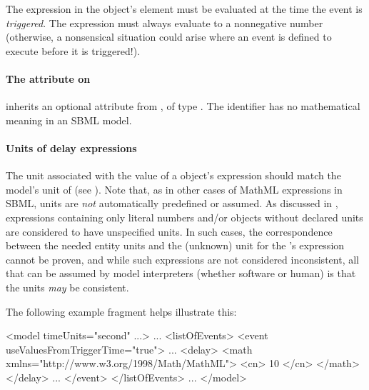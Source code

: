 The expression in the \Delay object's  element must be
evaluated at the time the event is \emph{triggered}.  The expression
must always evaluate to a nonnegative number (otherwise, a
nonsensical situation could arise where an event is defined to
execute before it is triggered!).


\begin{blockChanged}
\paragraph{The  attribute on }
\label{sec:delay-id}

\Delay inherits an optional  attribute from \SBase, of type .  The identifier has no mathematical meaning in an SBML \thisLV model.
\end{blockChanged}


\paragraph{Units of delay expressions}

The unit associated with the value of a \Delay object's
 expression should match the model's unit of
 (see ).  Note
that, as in other cases of MathML expressions in SBML, units are
\emph{not} automatically predefined or assumed.  As discussed in
, expressions containing only
literal numbers and/or \Parameter objects without declared units
are considered to have unspecified units.  In such cases, the
correspondence between the needed entity units and the (unknown)
unit for the \Delay's  expression cannot be proven,
and while such expressions are not considered inconsistent, all
that can be assumed by model interpreters (whether software or
human) is that the units \emph{may} be consistent.

The following \Event example fragment helps illustrate this:
\label{sec:event:delay:example}

\vspace*{0.5ex}
\begin{example}
<model timeUnits="second" ...>
    ...
    <listOfEvents>
        <event useValuesFromTriggerTime="true">
            ...
            <delay>
                <math xmlns="http://www.w3.org/1998/Math/MathML">
                    <cn> 10 </cn>
                </math>
            </delay>
            ...
        </event>
    </listOfEvents>
    ...
</model>
\end{example}
\vspace*{1ex}

